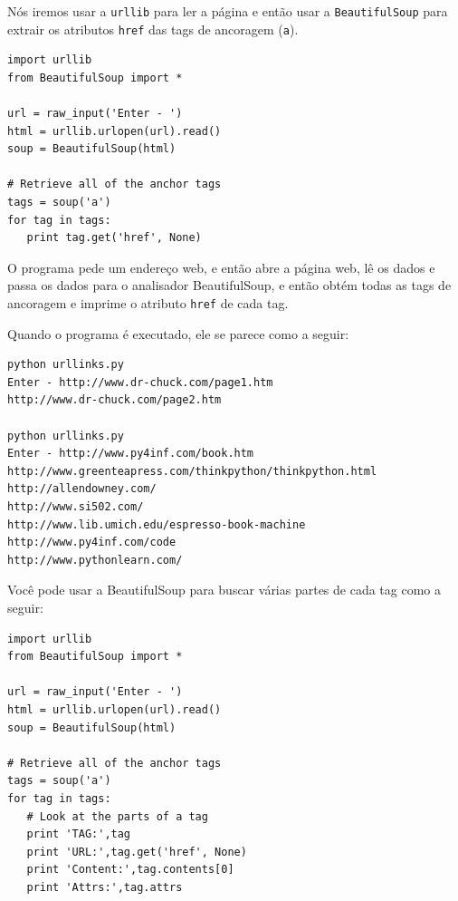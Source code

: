 Nós iremos usar a {\tt urllib} para ler a página e então usar a
{\tt BeautifulSoup} para extrair os atributos {\tt href} das tags
de ancoragem ({\tt a}).

\beforeverb
\begin{verbatim}
import urllib
from BeautifulSoup import *

url = raw_input('Enter - ')
html = urllib.urlopen(url).read()
soup = BeautifulSoup(html)

# Retrieve all of the anchor tags
tags = soup('a')
for tag in tags:
   print tag.get('href', None)
\end{verbatim}
\afterverb

O programa pede um endereço web, e então abre a página web,
lê os dados e passa os dados para o analisador BeautifulSoup, 
e então obtém todas as tags de ancoragem e imprime o atributo
{\tt href} de cada tag.

Quando o programa é executado, ele se parece como a seguir:

\beforeverb
\begin{verbatim}
python urllinks.py 
Enter - http://www.dr-chuck.com/page1.htm
http://www.dr-chuck.com/page2.htm

python urllinks.py 
Enter - http://www.py4inf.com/book.htm
http://www.greenteapress.com/thinkpython/thinkpython.html
http://allendowney.com/
http://www.si502.com/
http://www.lib.umich.edu/espresso-book-machine
http://www.py4inf.com/code
http://www.pythonlearn.com/
\end{verbatim}
\afterverb

Você pode usar a BeautifulSoup para buscar várias partes de cada 
tag como a seguir:

\beforeverb
\begin{verbatim}
import urllib
from BeautifulSoup import *

url = raw_input('Enter - ')
html = urllib.urlopen(url).read()
soup = BeautifulSoup(html)

# Retrieve all of the anchor tags
tags = soup('a')
for tag in tags:
   # Look at the parts of a tag
   print 'TAG:',tag
   print 'URL:',tag.get('href', None)
   print 'Content:',tag.contents[0]
   print 'Attrs:',tag.attrs
\end{verbatim}
\afterverb

